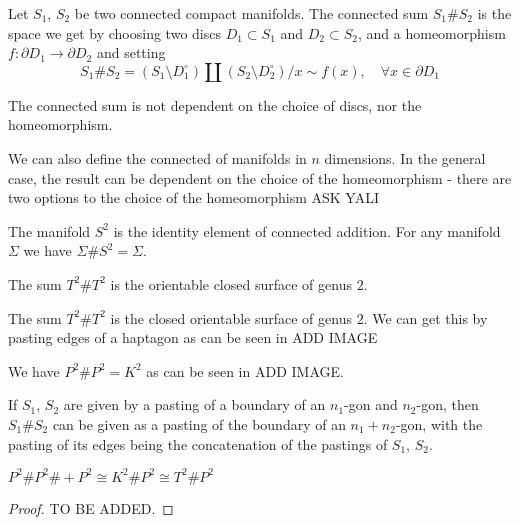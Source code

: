 \documentclass[11pt,a4paper]{article}
\begin{document}
\begin{definition}
  Let $S_1$, $S_2$ be two connected compact manifolds.
  The connected sum $S_1 \# S_2$ is the space we get by
  choosing two discs $D_1 \subset S_1$ and $D_2 \subset S_2$,
  and a homeomorphism $f \colon \partial D_1 \to \partial D_2$ and setting
  \[
    S_1 \# S_2 = 
    (S_1 \setminus D_1^{\circ}) \amalg
    (S_2 \setminus D_2^{\circ}) \slash x \sim f(x),
    \quad \forall x \in \partial D_1
  \]
\end{definition}
\begin{remark}
  The connected sum is not dependent on the choice of discs,
  nor the homeomorphism.
\end{remark}
\begin{remark}
  We can also define the connected of manifolds in $n$ dimensions.
  In the general case, the result can be dependent on the choice of the
  homeomorphism - there are two options to the choice of the homeomorphism
  ASK YALI
\end{remark}


\begin{example}
  The manifold $S^2$ is the identity element of connected addition.
  For any manifold $\Sigma$ we have $\Sigma \# S^2 = \Sigma$.
\end{example}
\begin{example}
  The sum $T^2 \# T^2$ is the orientable closed surface of genus $2$.
\end{example}
\begin{example}
  The sum $T^2 \# T^2$ is the closed orientable surface of genus $2$.
  We can get this by pasting edges of a haptagon as can be seen in ADD IMAGE
\end{example}
\begin{example}
  We have $P^2 \# P^2 = K^2$ as can be seen in ADD IMAGE.
\end{example}
\begin{example}
\end{example}

\begin{remark}
  If $S_1$, $S_2$ are given by a pasting of a boundary of an $n_1$-gon and
  $n_2$-gon, then $S_1 \# S_2$ can be given as a pasting of the boundary of
  an $n_1 + n_2$-gon, with the pasting of its edges being the concatenation
  of the pastings of $S_1$, $S_2$.
\end{remark}

\begin{proposition}
  $P^2 \# P^2 \# + P^2 \cong K^2 \# P^2 \cong T^2 \# P^2$
\end{proposition}
\begin{proof}
  TO BE ADDED.
\end{proof}
\end{document}
